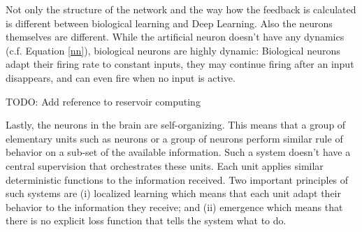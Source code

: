 Not only the structure of the network and the way how the feedback is calculated is different between biological learning and Deep Learning.
Also the neurons themselves are different.
While the artificial neuron doesn't have any dynamics (c.f. Equation \eqref*{nn}), biological neurons are highly dynamic:
Biological neurons adapt their firing rate to constant inputs, they may continue firing after an input disappears, and can even fire when no input is active.

TODO: Add reference to reservoir computing

Lastly, the neurons in the brain are self-organizing.
This means that a group of elementary units such as neurons or a group of neurons perform similar rule of behavior on a sub-set of the available information.
Such a system doesn't have a central supervision that orchestrates these units.
Each unit applies similar deterministic functions to the information received.
Two important principles of such systems are (i) localized learning which means that each unit adapt their behavior to the information they receive; and (ii) emergence which means that there is no explicit loss function that tells the system what to do.









